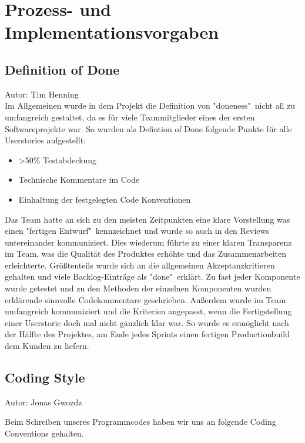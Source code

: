 \documentclass[twoside]{report}
\begin{document}
\section{Prozess- und Implementationsvorgaben}

\subsection{Definition of Done}
{\small Autor: Tim Henning}
\\
Im Allgemeinen wurde in dem Projekt die Definition von "doneness"\ nicht all zu umfangreich
gestaltet, da es für viele Teammitglieder eines der ersten Softwareprojekte war. So wurden als Defintion of Done folgende
Punkte für alle Userstories aufgestellt:
\begin{itemize}
  \item >50\% Testabdeckung
  \item Technische Kommentare im Code
  \item Einhaltung der festgelegten Code Konventionen
\end{itemize}
Das Team hatte an sich zu den meisten Zeitpunkten eine klare Vorstellung was einen "fertigen Entwurf"\ kennzeichnet und wurde so auch in den Reviews untereinander kommuniziert.
Dies wiederum führte zu einer klaren Transparenz im Team, was die Qualität des Produktes erhöhte und das Zusammenarbeiten erleichterte.
Größtenteils wurde sich
an die allgemeinen Akzeptanzkritieren gehalten und viele Backlog-Einträge als "done"\ erklärt. Zu fast jeder Komponente wurde
getestet und zu den Methoden der einzelnen Komponenten wurden erklärende sinnvolle Codekommentare geschrieben.
Außerdem wurde im Team umfangreich kommuniziert und die Kriterien angepasst, wenn die Fertigstellung einer Userstorie doch mal nicht gänzlich klar war.
So wurde es ermöglicht nach der Hälfte des Projektes, am Ende jedes Sprints einen fertigen Productionbuild dem Kunden zu liefern.



\subsection{Coding Style}
{\small Autor: Jonas Gwozdz}

\vspace{\baselineskip}
\noindent Beim Schreiben unseres Programmcodes haben wir uns an folgende Coding Conventions gehalten.\par
\end{document}
